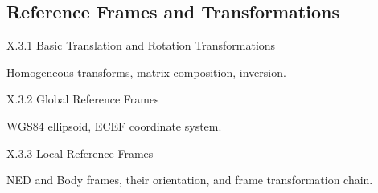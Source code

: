 \subsection{Reference Frames and Transformations}

X.3.1 Basic Translation and Rotation Transformations

Homogeneous transforms, matrix composition, inversion.

X.3.2 Global Reference Frames

WGS84 ellipsoid, ECEF coordinate system.

X.3.3 Local Reference Frames

NED and Body frames, their orientation, and frame transformation chain.